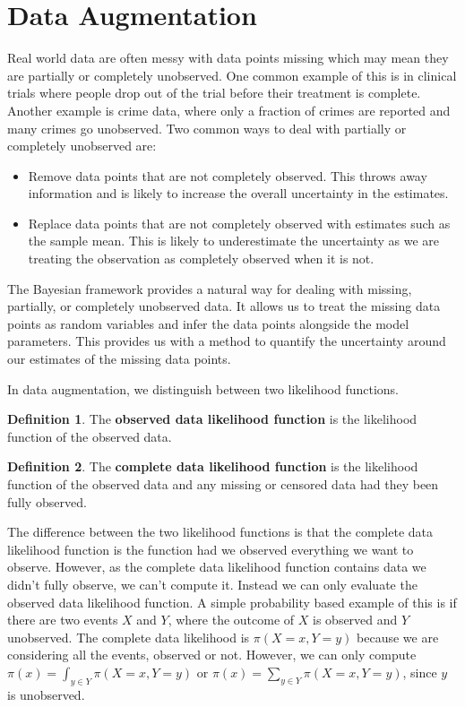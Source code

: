 \documentclass[
]{book}
\providecommand{\tightlist}{%
  \setlength{\itemsep}{0pt}\setlength{\parskip}{0pt}}
\theoremstyle{definition}
\newtheorem{definition}{Definition}[chapter]
\theoremstyle{definition}
\theoremstyle{definition}
\theoremstyle{definition}
\theoremstyle{remark}
\begin{document}
\hypertarget{data-augmentation}{%
\section{Data Augmentation}\label{data-augmentation}}

Real world data are often messy with data points missing which may mean they are partially or completely unobserved. One common example of this is in clinical trials where people drop out of the trial before their treatment is complete. Another example is crime data, where only a fraction of crimes are reported and many crimes go unobserved. Two common ways to deal with partially or completely unobserved are:

\begin{itemize}
\tightlist
\item
  Remove data points that are not completely observed. This throws away information and is likely to increase the overall uncertainty in the estimates.
\item
  Replace data points that are not completely observed with estimates such as the sample mean. This is likely to underestimate the uncertainty as we are treating the observation as completely observed when it is not.
\end{itemize}

The Bayesian framework provides a natural way for dealing with missing, partially, or completely unobserved data. It allows us to treat the missing data points as random variables and infer the data points alongside the model parameters. This provides us with a method to quantify the uncertainty around our estimates of the missing data points.

In data augmentation, we distinguish between two likelihood functions.

\begin{definition}
The \textbf{observed data likelihood function} is the likelihood function of the observed data.
\end{definition}

\begin{definition}
The \textbf{complete data likelihood function} is the likelihood function of the observed data and any missing or censored data had they been fully observed.
\end{definition}

The difference between the two likelihood functions is that the complete data likelihood function is the function had we observed everything we want to observe. However, as the complete data likelihood function contains data we didn't fully observe, we can't compute it. Instead we can only evaluate the observed data likelihood function. A simple probability based example of this is if there are two events \(X\) and \(Y\), where the outcome of \(X\) is observed and \(Y\) unobserved. The complete data likelihood is \(\pi(X = x, Y = y)\) because we are considering all the events, observed or not. However, we can only compute \(\pi(x) = \int_{y \in Y}\pi(X = x, Y = y)\) or \(\pi(x) = \sum_{y \in Y}\pi(X = x, Y = y)\), since \(y\) is unobserved.
\end{document}
